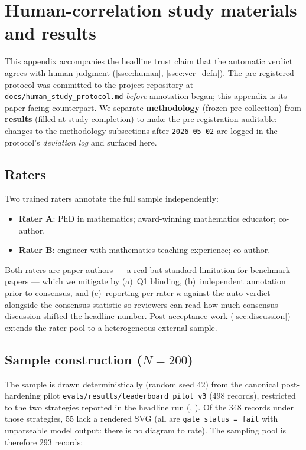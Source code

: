 \section{Human-correlation study materials and results}
\label{app:human_study}

This appendix accompanies the headline trust claim that the \GeoGenBench automatic verdict agrees with human judgment (\cref{ssec:human}, \cref{ssec:ver_defn}).
The pre-registered protocol was committed to the project repository at \texttt{docs/human\_study\_protocol.md} \emph{before} annotation began; this appendix is its paper-facing counterpart.
We separate \textbf{methodology} (frozen pre-collection) from \textbf{results} (filled at study completion) to make the pre-registration auditable: changes to the methodology subsections after \texttt{2026-05-02} are logged in the protocol's \emph{deviation log} and surfaced here.

\subsection{Raters}
\label{app:human_study:raters}

Two trained raters annotate the full sample independently:

\begin{itemize}
\item \textbf{Rater A}: PhD in mathematics; award-winning mathematics educator; co-author.
\item \textbf{Rater B}: engineer with mathematics-teaching experience; co-author.
\end{itemize}

Both raters are paper authors --- a real but standard limitation for benchmark papers --- which we mitigate by (a)~Q1 blinding, (b)~independent annotation prior to consensus, and (c)~reporting per-rater $\kappa$ against the auto-verdict alongside the consensus statistic so reviewers can read how much consensus discussion shifted the headline number.
Post-acceptance work (\cref{sec:discussion}) extends the rater pool to a heterogeneous external sample.

\subsection{Sample construction ($N = 200$)}
\label{app:human_study:sample}

The sample is drawn deterministically (random seed 42) from the canonical post-hardening pilot \texttt{evals/results/leaderboard\_pilot\_v3} (498 records), restricted to the two strategies reported in the headline run (\rawcode, \structured).
Of the 348 records under those strategies, 55 lack a rendered SVG (all are \texttt{gate\_status\,=\,fail} with unparseable model output: there is no diagram to rate).
The sampling pool is therefore 293 records:

